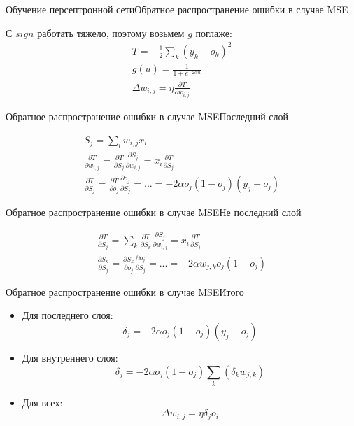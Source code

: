 \documentclass[14pt, fleqn, xcolor={dvipsnames, table}]{beamer}
\begin{document}
\begin{frame}{Обучение персептронной сети}{Обратное распространение ошибки в случае MSE}

С $sign$ работать тяжело, поэтому возьмем $g$ поглаже:
$$\begin{array}{c}
T = -\frac{1}{2}\sum_k(y_k - o_k)^2 \\
g(u) = \frac{1}{1 + e^{-2\alpha u}} \\
\Delta w_{i,j} = \eta\frac{\partial T}{\partial w_{i,j}}
\end{array}$$

\end{frame}

\begin{frame}{Обратное распространение ошибки в случае MSE}{Последний слой}


$$\begin{array}{c}
S_j = \sum_i w_{i,j}x_i \\
\frac{\partial T}{\partial w_{i,j}} = \frac{\partial T}{\partial S_j} \frac{\partial S_j}{\partial w_{i,j}} = x_i \frac{\partial T}{\partial S_j} \\
\frac{\partial T}{\partial S_j} = \frac {\partial T}{\partial o_j} \frac{\partial o_j}{\partial S_j} = ... = -2 \alpha o_j (1 - o_j) (y_j - o_j)
\end{array}$$

\end{frame}

\begin{frame}{Обратное распространение ошибки в случае MSE}{Не последний слой}


$$\begin{array}{c}
\frac{\partial T}{\partial S_j} = \sum_k \frac{\partial T}{\partial S_k} \frac{\partial S_j}{\partial w_{i,j}} = x_i \frac{\partial T}{\partial S_j} \\
\frac{\partial S_k}{\partial S_j} = \frac {\partial S_k}{\partial o_j} \frac{\partial o_j}{\partial S_j} = ... = -2 \alpha w_{j,k} o_j (1 - o_j)
\end{array}$$

\end{frame}

\begin{frame}{Обратное распространение ошибки в случае MSE}{Итого}
\begin{itemize}
\item Для последнего слоя:
$$
\delta_j = -2\alpha o_j(1-o_j)(y_j - o_j)
$$
\item Для внутреннего слоя:
$$
\delta_j = -2\alpha o_j(1-o_j)\sum_k(\delta_kw_{j,k})
$$
\item Для всех:
$$
\Delta w_{i,j} = \eta \delta_j o_i
$$
\end{itemize}

\end{frame}
\end{document}
